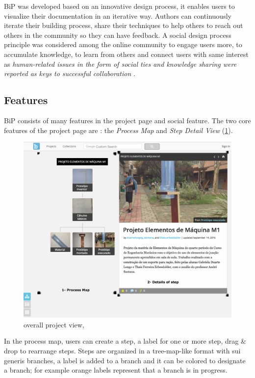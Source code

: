BiP was developed based on an innovative design process, it enables users to visualize their documentation in an iterative way. Authors can continuously iterate their building process, share their techniques to help others to reach out others in the community so they can have feedback. A social design process principle was considered among the online community to engage users more, to accumulate knowledge, to learn from others and connect users with same interest as \textit{human-related issues in the form of social ties and knowledge sharing were reported as keys to successful collaboration} \cite{Kotlarsky2005}.

\subsection{Features}\label{sec:feature}
BiP consists of many features in the project page and social feature. The two core features of the project page are : the \textit{Process Map} and \textit{Step Detail View } (\ref{img-bipprojectpage}).
\begin{figure}[ht!]
	\centering
	\includegraphics[width=.3\textheight]{./images/img-bipprojectpage.png}
	\caption{overall project view, \cite[\url{http://buildinprogress.media.mit.edu/projects/4599/steps}]{BuildinP1}} 
	\label{img-bipprojectpage}
\end{figure}
In the process map, users can create a step, a label for one or more step, drag \& drop  to rearrange steps. Steps are organized in a tree-map-like format with sui generis branches, a label is added to a branch and it can be colored to designate a branch; for example orange labels represent that a branch is in progress.

